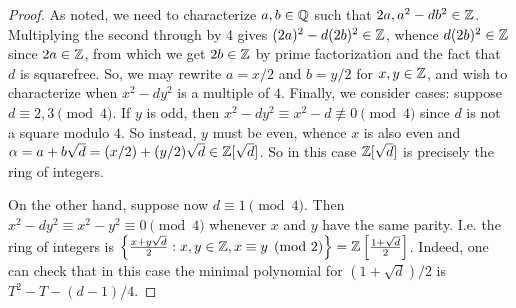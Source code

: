 \begin{proof}
	As noted, we need to characterize $a,b \in \mathbb{Q}$ such that $2a,a^2-db^2 \in \mathbb{Z}$. Multiplying the second through by 4 gives $(2a)^2-d(2b)^2 \in \mathbb{Z}$, whence $d(2b)^2 \in \mathbb{Z}$ since $2a \in \mathbb{Z}$, from which we get $2b \in \mathbb{Z}$ by prime factorization and the fact that $d$ is squarefree. So, we may rewrite $a = x/2$ and $b = y/2$ for $x,y \in \mathbb{Z}$, and wish to characterize when $x^2-dy^2$ is a multiple of $4$. Finally, we consider cases: suppose $d \equiv 2,3 \pmod{4}$. If $y$ is odd, then $x^2-dy^2 \equiv x^2-d \not\equiv 0 \pmod{4}$ since $d$ is not a square modulo $4$. So instead, $y$ must be even, whence $x$ is also even and $\alpha = a+b\sqrt{d} = (x/2)+(y/2)\sqrt{d} \in \mathbb{Z}[\sqrt{d}]$. So in this case $\mathbb{Z}[\sqrt{d}]$ is precisely the ring of integers.
	
	On the other hand, suppose now $d \equiv 1 \pmod{4}$. Then $x^2-dy^2 \equiv x^2-y^2 \equiv 0 \pmod{4}$ whenever $x$ and $y$ have the same parity. I.e. the ring of integers is $\left\{ \frac{x+y\sqrt{d}}{2} : x,y \in \mathbb{Z}, x \equiv y \pmod{2} \right\} = \mathbb{Z}\left[\frac{1+\sqrt{d}}{2}\right]$. Indeed, one can check that in this case the minimal polynomial for $(1+\sqrt{d})/2$ is $T^2-T-(d-1)/4$.
\end{proof}
